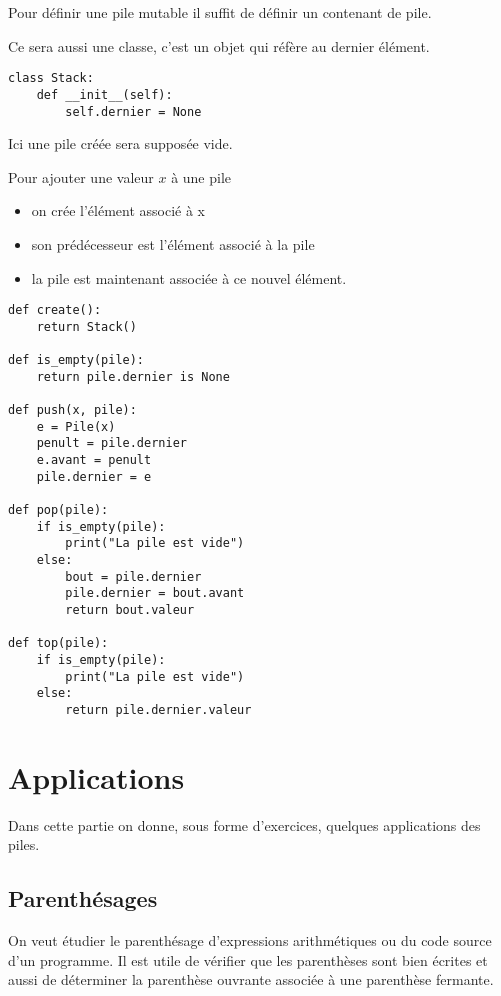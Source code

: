Pour définir une pile mutable il suffit de définir un contenant de pile.

Ce sera aussi une classe, c'est un objet qui réfère au dernier élément.
\begin{lstlisting}
class Stack:
    def __init__(self):
        self.dernier = None
\end{lstlisting}

Ici une pile créée sera supposée vide.

\newpage
Pour ajouter une valeur $x$ à une pile 
\begin{itemize}
\item on crée l'élément associé à x
\item son prédécesseur est l'élément associé à la pile
\item la pile est maintenant associée à ce nouvel élément.
\end{itemize}
\begin{lstlisting}[caption = {Fonctions de piles avec des objets}]
def create():
    return Stack()
    
def is_empty(pile):
    return pile.dernier is None

def push(x, pile):
    e = Pile(x)
    penult = pile.dernier
    e.avant = penult
    pile.dernier = e
   
def pop(pile):
    if is_empty(pile):
        print("La pile est vide")
    else:
        bout = pile.dernier
        pile.dernier = bout.avant
        return bout.valeur
   
def top(pile):
    if is_empty(pile):
        print("La pile est vide")
    else:
        return pile.dernier.valeur
\end{lstlisting}
\newpage
\section{Applications}
Dans cette partie on donne, sous forme d'exercices, quelques applications des piles.
\subsection{Parenthésages}\label{app:parentheses}
On veut étudier le parenthésage d'expressions arithmétiques ou du code source d'un programme. Il est utile de vérifier que les parenthèses sont bien écrites et aussi de déterminer la parenthèse ouvrante associée à une parenthèse fermante.

